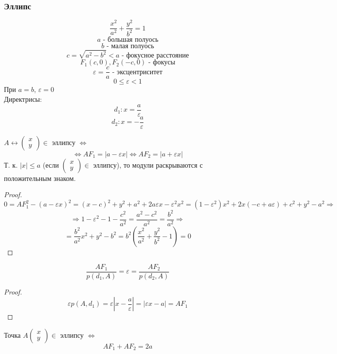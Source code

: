 \subsubsection{Эллипс}
\[
\frac{x^{2}}{a^{2}} + \frac{y^{2}}{b^{2}} = 1
\]
\[
a \text{ - большая полуось}
\]
\[
b \text{ - малая полуось}
\]
\[
c = \sqrt{a^{2} - b^{2}} < a \text{ - фокусное расстояние}
\]
\[
F_1(c, 0), F_2(-c, 0) \text{ - фокусы}
\]
\[
\varepsilon = \frac{c}{a} \text{ - эксцентриситет} 
\]
\[
  0 \leq \varepsilon < 1
\]
При $a = b$, $\varepsilon = 0$ \\
Директрисы:
\[
d_1 \colon x = \frac{a}{\varepsilon}
\]
\[
  d_2 \colon x = -\frac{a}{\varepsilon}
\]
\begin{statement}
$A \underset{}{\longleftrightarrow} \begin{pmatrix}x \\ y \end{pmatrix} \in $ эллипсу $\iff$
\[
\iff AF_1 = \left|a - \varepsilon x\right|  \iff AF_2 = \left|a + \varepsilon x\right|
\]
Т. к. $\left|x\right| \leq a$ (если $\begin{pmatrix}x \\ y \end{pmatrix} \in$ эллипсу), то модули раскрываются с положительным знаком.
\end{statement}
\begin{proof}
\[
0 = AF_1^{2} - (a - \varepsilon x)^{2} = (x - c)^{2} + y^{2} + a^{2} + 2a\varepsilon x - \varepsilon^{2}x^{2} = (1 - \varepsilon^{2}) x^{2} + 2x(-c + a\varepsilon) + c^{2} + y^{2} - a^{2} \Rightarrow
\]
\[
\Rightarrow 1 - \varepsilon^{2} - 1 - \frac{c^{2}}{a^{2}} = \frac{a^{2} - c^{2}}{a^{2}} = \frac{b^{2}}{a^{2}} \Rightarrow
\]
\[
= \frac{b^{2}}{a^{2}}x^{2} + y^{2} - b^{2} = b^{2}(\frac{x^{2}}{a^{2}} + \frac{y^{2}}{b^{2}} - 1) = 0
\]
\end{proof}
\begin{theorem}
\[
\frac{AF_1}{p(d_1, A)} = \varepsilon = \frac{AF_2}{p(d_2, A)}
\]
\end{theorem}
\begin{proof}
\[
\varepsilon p(A, d_1) = \varepsilon \left|x - \frac{a}{\varepsilon}\right| = \left|\varepsilon x - a\right| = AF_1
\]
\end{proof}
\begin{theorem}
  Точка $A\begin{pmatrix}x \\ y \end{pmatrix} \in $ эллипсу $\iff$
  \[
  AF_1 + AF_2 = 2a
  \]
\end{theorem}
